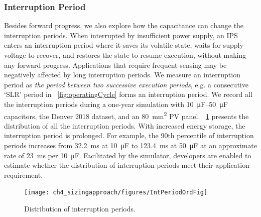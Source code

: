 \subsubsection{Interruption Period} \label{subsubsec:intper}
Besides forward progress, we also explore how the capacitance can change the interruption periods. 
When interrupted by insufficient power supply, an IPS enters an interruption period where it saves its volatile state, waits for supply voltage to recover, and restores the state to resume execution, without making any forward progress. Applications that require frequent sensing may be negatively affected by long interruption periods. We measure an interruption period as \textit{the period between two successive execution periods}, e.g. a consecutive `SLR' period in \figurename{~\ref{fig:operatingCycle}} forms an interruption period. 
We record all the interruption periods during a one-year simulation with \SIrange{10}{50}{\micro\farad} capacitors, the Denver 2018 dataset, and an \SI{80}{\square\milli\meter} PV panel. 
\figurename{~\ref{fig:interruption}} presents the distribution of all the interruption periods. 
With increased energy storage, the interruption period is prolonged. For example, the 90th percentile of interruption periods increases from \SI{32.2}{\milli\second} at \SI{10}{\micro\farad} to \SI{123.4}{\milli\second} at \SI{50}{\micro\farad} at an approximate rate of \SI{23}{\milli\second} per \SI{10}{\micro\farad}. 
Facilitated by the simulator, developers are enabled to estimate whether the distribution of interruption periods meet their application requirement. 



\begin{figure}
    \centering
    \texttt{[image: ch4\_sizingapproach/figures/IntPeriodOrdFig]}
    \caption{Distribution of interruption periods. }
    \label{fig:interruption}
\end{figure}


